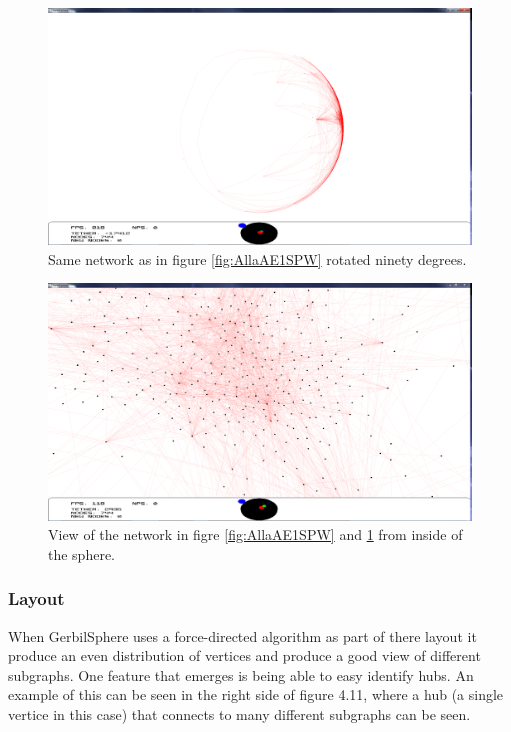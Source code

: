 \documentclass[a4paper,11pt]{kth-mag}
\begin{document}
\begin{figure}[!htbp]
	\centering
	\includegraphics[scale=0.3]{SesammVisualAppPics/SphericalView/AE/AE2}
	\caption{Same network as in figure \ref{fig:AllaAE1SPW} rotated ninety degrees.}
	\label{fig:AllaAE2SPW}
\end{figure}

\begin{figure}[!htbp]
	\centering
	\includegraphics[scale=0.3]{SesammVisualAppPics/SphericalView/AE/AE5}
	\caption{View of the network in figre \ref{fig:AllaAE1SPW} and \ref{fig:AllaAE2SPW} from inside of the sphere.}
	\label{fig:AllaAE3SPW}
\end{figure}
\newpage

\subsubsection{Layout}
When GerbilSphere uses a force-directed algorithm as part of there layout it produce an even distribution of vertices and produce a good view of different subgraphs. One feature that emerges 
is being able to easy identify hubs. An example of this can be seen in the right side of figure 4.11, where a hub (a single vertice in this case) that connects to many different subgraphs can be seen.
\end{document}
